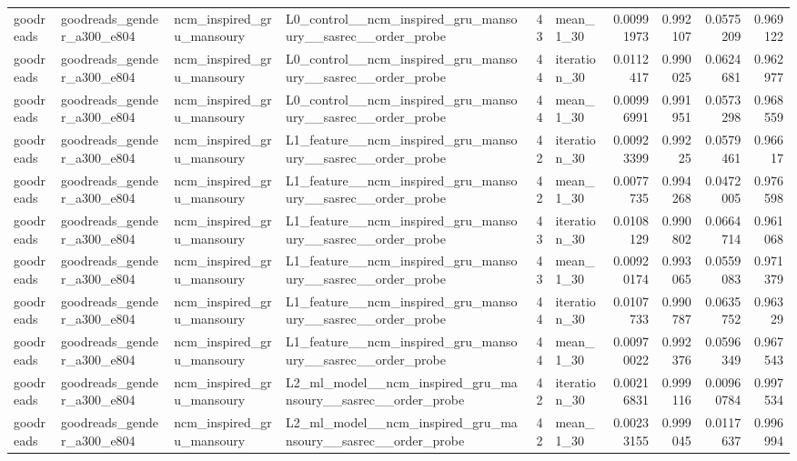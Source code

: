 \begin{table}[htbp!]
\begin{tabular}{llllrlrrrr}
goodreads & goodreads\_gender\_a300\_e804 & ncm\_inspired\_gru\_mansoury & L0\_control\_\_ncm\_inspired\_gru\_mansoury\_\_sasrec\_\_order\_probe & 43 & mean\_1\_30 & 0.00991973 & 0.992107 & 0.0575209 & 0.969122 \\
goodreads & goodreads\_gender\_a300\_e804 & ncm\_inspired\_gru\_mansoury & L0\_control\_\_ncm\_inspired\_gru\_mansoury\_\_sasrec\_\_order\_probe & 44 & iteration\_30 & 0.0112417 & 0.990025 & 0.0624681 & 0.962977 \\
goodreads & goodreads\_gender\_a300\_e804 & ncm\_inspired\_gru\_mansoury & L0\_control\_\_ncm\_inspired\_gru\_mansoury\_\_sasrec\_\_order\_probe & 44 & mean\_1\_30 & 0.00996991 & 0.991951 & 0.0573298 & 0.968559 \\
goodreads & goodreads\_gender\_a300\_e804 & ncm\_inspired\_gru\_mansoury & L1\_feature\_\_ncm\_inspired\_gru\_mansoury\_\_sasrec\_\_order\_probe & 42 & iteration\_30 & 0.00923399 & 0.99225 & 0.0579461 & 0.96617 \\
goodreads & goodreads\_gender\_a300\_e804 & ncm\_inspired\_gru\_mansoury & L1\_feature\_\_ncm\_inspired\_gru\_mansoury\_\_sasrec\_\_order\_probe & 42 & mean\_1\_30 & 0.0077735 & 0.994268 & 0.0472005 & 0.976598 \\
goodreads & goodreads\_gender\_a300\_e804 & ncm\_inspired\_gru\_mansoury & L1\_feature\_\_ncm\_inspired\_gru\_mansoury\_\_sasrec\_\_order\_probe & 43 & iteration\_30 & 0.0108129 & 0.990802 & 0.0664714 & 0.961068 \\
goodreads & goodreads\_gender\_a300\_e804 & ncm\_inspired\_gru\_mansoury & L1\_feature\_\_ncm\_inspired\_gru\_mansoury\_\_sasrec\_\_order\_probe & 43 & mean\_1\_30 & 0.00920174 & 0.993065 & 0.0559083 & 0.971379 \\
goodreads & goodreads\_gender\_a300\_e804 & ncm\_inspired\_gru\_mansoury & L1\_feature\_\_ncm\_inspired\_gru\_mansoury\_\_sasrec\_\_order\_probe & 44 & iteration\_30 & 0.0107733 & 0.990787 & 0.0635752 & 0.96329 \\
goodreads & goodreads\_gender\_a300\_e804 & ncm\_inspired\_gru\_mansoury & L1\_feature\_\_ncm\_inspired\_gru\_mansoury\_\_sasrec\_\_order\_probe & 44 & mean\_1\_30 & 0.00970022 & 0.992376 & 0.0596349 & 0.967543 \\
goodreads & goodreads\_gender\_a300\_e804 & ncm\_inspired\_gru\_mansoury & L2\_ml\_model\_\_ncm\_inspired\_gru\_mansoury\_\_sasrec\_\_order\_probe & 42 & iteration\_30 & 0.00216831 & 0.999116 & 0.00960784 & 0.997534 \\
goodreads & goodreads\_gender\_a300\_e804 & ncm\_inspired\_gru\_mansoury & L2\_ml\_model\_\_ncm\_inspired\_gru\_mansoury\_\_sasrec\_\_order\_probe & 42 & mean\_1\_30 & 0.00233155 & 0.999045 & 0.0117637 & 0.996994 \\

\end{tabular}
\end{table}
